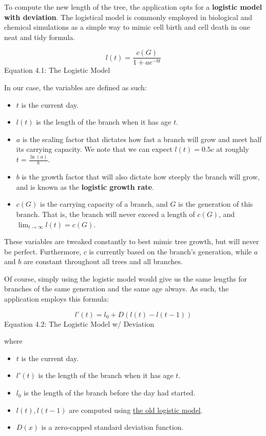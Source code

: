 \hypertarget{logistic}{To compute the new length of the tree, the application opts for a \textbf{logistic model with deviation}. The logistical model is commonly employed in biological and chemical simulations as a simple way to mimic cell birth and cell death in one neat and tidy formula.}

$$l(t) = \frac{c(G)}{1+ae^{-bt}}$$
\centering Equation 4.1: The Logistic Model

\medskip\justifying
\setlength{\parindent}{0pt}
\setlength{\parskip}{8pt}
In our case, the variables are defined as such:
\begin{itemize}
    \item $t$ is the current day.
    \item $l(t)$ is the length of the branch when it has age $t$.
    \item $a$ is the scaling factor that dictates how fast a branch will grow and meet half its carrying capacity. We note that we can expect $l(t) = 0.5c$ at roughly $t = \frac{\ln(a)}{b}$.
    \item $b$ is the growth factor that will also dictate how steeply the branch will grow, and is known as the \textbf{logistic growth rate}.
    \item $c(G)$ is the carrying capacity of a branch, and $G$ is the generation of this branch. That is, the branch will never exceed a length of $c(G)$, and $\lim_{t \rightarrow \infty} l(t) = c(G)$.
\end{itemize}

These variables are tweaked constantly to best mimic tree growth, but will never be perfect. Furthermore, $c$ is currently based on the branch's generation, while $a$ and $b$ are constant throughout all trees and all branches.

Of course, simply using the logistic model would give us the same lengths for branches of the same generation and the same age always. As such, the application employs this formula:

$$l'(t) = l_0 + D(l(t)-l(t-1)) $$
\centering Equation 4.2: The Logistic Model w/ Deviation

\medskip\justifying
\setlength{\parindent}{0pt}
\setlength{\parskip}{8pt}
where
\begin{itemize}
    \item $t$ is the current day.
    \item $l'(t)$ is the length of the branch when it has age $t$.
    \item $l_0$ is the length of the branch before the day had started.
    \item $l(t), l(t-1)$ are computed using \hyperlink{logistic}{the old logistic model}.
    \item $D(x)$ is a zero-capped standard deviation function.
\end{itemize}

